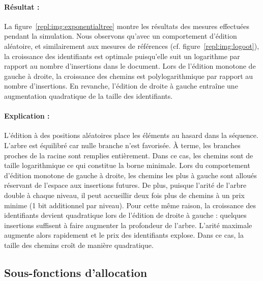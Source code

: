 \paragraph{Résultat :} La figure~\ref{repl:img:exponentialtree} montre les
résultats des mesures effectuées pendant la simulation. Nous observons qu'avec
un comportement d'édition aléatoire, et similairement aux mesures de références
(cf. figure~\ref{repl:img:logoot}), la croissance des identifiants est optimale
puisqu'elle suit un logarithme par rapport au nombre d'insertions dans le
document. Lors de l'édition monotone de gauche à droite, la croissance des
chemins est polylogarithmique par rapport au nombre d'insertions. En revanche,
l'édition de droite à gauche entraîne une augmentation quadratique de la taille
des identifiants.

\paragraph{Explication :} L'édition à des positions aléatoires place les
éléments au hasard dans la séquence. L'arbre est équilibré car nulle branche
n'est favorisée. À terme, les branches proches de la racine sont remplies
entièrement. Dans ce cas, les chemins sont de taille logarithmique ce qui
constitue la borne minimale. Lors du comportement d'édition monotone de gauche à
droite, les chemins les plus à gauche sont alloués réservant de l'espace aux
insertions futures. De plus, puisque l'arité de l'arbre double à chaque niveau,
il peut accueillir deux fois plus de chemins à un prix minime (1 bit additionnel
par niveau). Pour cette même raison, la croissance des identifiants devient
quadratique lors de l'édition de droite à gauche : quelques insertions suffisent
à faire augmenter la profondeur de l'arbre. L'arité maximale augmente alors
rapidement et le prix des identifiants explose. Dans ce cas, la taille des
chemins croît de manière quadratique.


\subsection{Sous-fonctions d'allocation}

